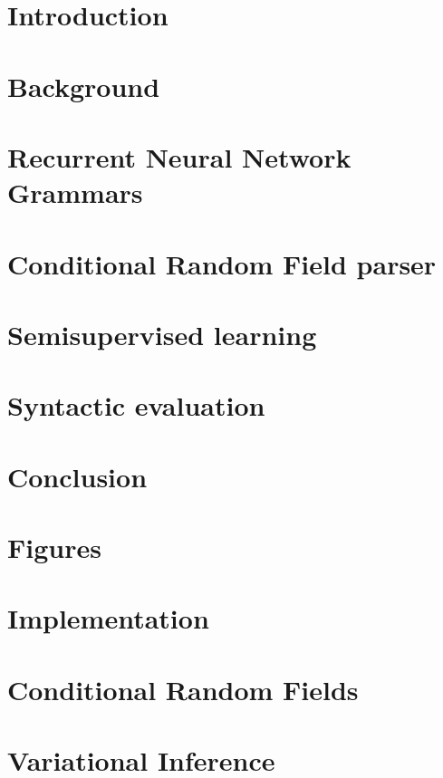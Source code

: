 \documentclass[examplefnt,biber]{../src/nowfnt} %
\begin{document}
\chapter{Introduction}
\label{01-introduction}



\chapter{Background}
\label{02-background}



\chapter{Recurrent Neural Network Grammars}
\label{03-rnng}



\chapter{Conditional Random Field parser}
\label{04-crf}



\chapter{Semisupervised learning}
\label{05-semisupervised}



\chapter{Syntactic evaluation}
\label{06-syneval}



\chapter{Conclusion}
\label{07-conclusion}



\begin{acknowledgements}

\end{acknowledgements}

\appendix
\chapter{Figures}
\label{A1-figures}


\chapter{Implementation}
\label{A2-implementation}


\chapter{Conditional Random Fields}
\label{A3-crf}


\chapter{Variational Inference}
\label{A4-vi}



\backmatter  %

\printbibliography
\end{document}
